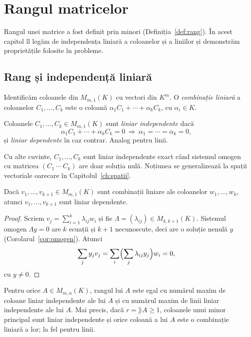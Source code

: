 \chapter{Rangul matricelor}\label{ch:rang}

Rangul unei matrice a fost definit prin minori (Definiția~\ref{def:rang}). În acest capitol îl legăm de independența liniară a coloanelor și a liniilor și demonstrăm proprietățile folosite în probleme.

\section{Rang și independență liniară}

Identificăm coloanele din $M_{m,1}(K)$ cu vectori din $K^m$. O \emph{combinație liniară} a coloanelor $C_1,\dots,C_k$ este o coloană $\alpha_1C_1+\cdots+\alpha_kC_k$, cu $\alpha_i\in K$.

\begin{definitie}
Coloanele $C_1,\dots,C_k\in M_{m,1}(K)$ sunt \emph{liniar independente} dacă
\[
\alpha_1C_1+\cdots+\alpha_kC_k=0\ \Longrightarrow\ \alpha_1=\cdots=\alpha_k=0,
\]
și \emph{liniar dependente} în caz contrar. Analog pentru linii.
\end{definitie}

Cu alte cuvinte, $C_1,\dots,C_k$ sunt liniar independente exact când sistemul omogen cu matricea $(C_1\ \cdots\ C_k)$ are doar soluția nulă. Noțiunea se generalizează la spații vectoriale oarecare în Capitolul~\ref{ch:spatii}.

\begin{lema}\label{lema:maimulticomb}
Dacă $v_1,\dots,v_{k+1}\in M_{m,1}(K)$ sunt combinații liniare ale coloanelor $w_1,\dots,w_k$, atunci $v_1,\dots,v_{k+1}$ sunt liniar dependente.
\end{lema}

\begin{proof}
Scriem $v_j=\sum_{i=1}^k\lambda_{ij}w_i$ și fie $\Lambda=(\lambda_{ij})\in M_{k,k+1}(K)$. Sistemul omogen $\Lambda y=0$ are $k$ ecuații și $k+1$ necunoscute, deci are o soluție nenulă $y$ (Corolarul~\ref{cor:omogen}). Atunci
\[
\sum_{j}y_jv_j=\sum_i\Bigl(\sum_j\lambda_{ij}y_j\Bigr)w_i=0,
\]
cu $y\neq0$.
\end{proof}

\begin{teorema}\label{teo:rangcoloane}
Pentru orice $A\in M_{m,n}(K)$, rangul lui $A$ este egal cu numărul maxim de coloane liniar independente ale lui $A$ și cu numărul maxim de linii liniar independente ale lui $A$. Mai precis, dacă $r=\rang A\ge1$, coloanele unui minor principal sunt liniar independente și orice coloană a lui $A$ este o combinație liniară a lor; la fel pentru linii.
\end{teorema}

